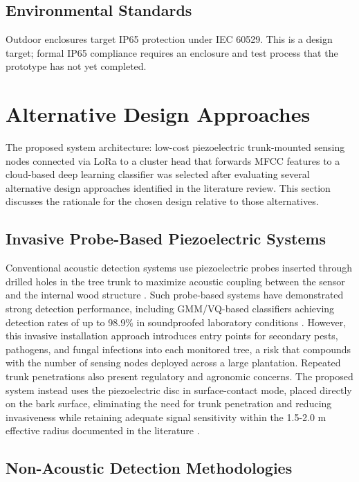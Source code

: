 \documentclass[12pt,a4paper,oneside]{memoir}
\newcommand{\newrevision}[1]{\textcolor{green!45!black}{#1}}
\begin{document}
\subsection{Environmental Standards}

\newrevision{Outdoor enclosures target IP65 protection under IEC 60529. This is a design target; formal IP65 compliance requires an enclosure and test process that the prototype has not yet completed.}

\section{Alternative Design Approaches}

The proposed system architecture: low-cost piezoelectric trunk-mounted sensing nodes connected via LoRa to a cluster head that forwards MFCC features to a cloud-based deep learning classifier was selected after evaluating several alternative design approaches identified in the literature review. This section discusses the rationale for the chosen design relative to those alternatives.

\subsection{Invasive Probe-Based Piezoelectric Systems}

Conventional acoustic detection systems use piezoelectric probes inserted through drilled holes in the tree trunk to maximize acoustic coupling between the sensor and the internal wood structure \cite{pinhas2008,karar2022}. Such probe-based systems have demonstrated strong detection performance, including GMM/VQ-based classifiers achieving detection rates of up to 98.9\% in soundproofed laboratory conditions \cite{pinhas2008}. However, this invasive installation approach introduces entry points for secondary pests, pathogens, and fungal infections into each monitored tree, a risk that compounds with the number of sensing nodes deployed across a large plantation. Repeated trunk penetrations also present regulatory and agronomic concerns. The proposed system instead uses the piezoelectric disc in surface-contact mode, placed directly on the bark surface, eliminating the need for trunk penetration and reducing invasiveness while retaining adequate signal sensitivity within the 1.5-2.0 m effective radius documented in the literature \cite{pinhas2008,karar2022}.



\subsection{Non-Acoustic Detection Methodologies}
\end{document}
